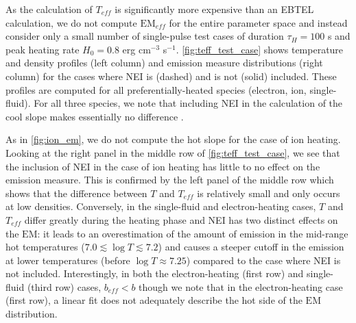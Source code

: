 \documentclass[apj]{emulateapj}
\begin{document}
	\par As the calculation of $T_{eff}$ is significantly more expensive than an EBTEL calculation, we do not compute $\mathrm{EM}_{eff}$ for the entire parameter space and instead consider only a small number of single-pulse test cases of duration $\tau_H=100$ s and peak heating rate $H_0=0.8$ erg cm$^{-3}$ s$^{-1}$. \autoref{fig:teff_test_case} shows temperature and density profiles (left column)  and emission measure distributions (right column) for the cases where NEI is (dashed) and is not (solid) included. These profiles are computed for all preferentially-heated species (electron, ion, single-fluid). For all three species, we note that including NEI in the calculation of the cool slope makes essentially no difference .
	\par As in \autoref{fig:ion_em}, we do not compute the hot slope for the case of ion heating. Looking at the right panel in the middle row of \autoref{fig:teff_test_case}, we see that the inclusion of NEI in the case of ion heating has little to no effect on the emission measure. This is confirmed by the left panel of the middle row which shows that the difference between $T$ and $T_{eff}$ is relatively small and only occurs at low densities. Conversely, in the single-fluid and electron-heating cases, $T$ and $T_{eff}$ differ greatly during the heating phase and NEI has two distinct effects on the $\mathrm{EM}$: it leads to an overestimation of the amount of emission in the mid-range hot temperatures ($7.0\lesssim\log{T}\lesssim7.2$) and causes a steeper cutoff in the emission at lower temperatures (before $\log{T}\approx7.25$) compared to the case where NEI is not included. Interestingly, in both the electron-heating (first row) and single-fluid (third row) cases, $b_{eff}<b$ though we note that in the electron-heating case (first row), a linear fit does not adequately describe the hot side of the $\mathrm{EM}$ distribution.
\end{document}

